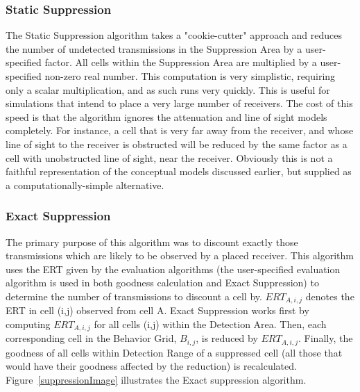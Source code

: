 \subsubsection{Static Suppression}
\label{staticSuppression}
The Static Suppression algorithm takes a "cookie-cutter" approach and reduces the number of undetected transmissions in the Suppression Area by a user-specified factor.  All cells within the Suppression Area are multiplied by a user-specified non-zero real number.  This computation is very simplistic, requiring only a scalar multiplication, and as such runs very quickly.  This is useful for simulations that intend to place a very large number of receivers.  The cost of this speed is that the algorithm ignores the attenuation and line of sight models completely.  For instance, a cell that is very far away from the receiver, and whose line of sight to the receiver is obstructed will be reduced by the same factor as a cell with unobstructed line of sight, near the receiver.  Obviously this is not a faithful representation of the conceptual models discussed earlier, but supplied as a computationally-simple alternative.

\subsubsection{Exact Suppression}
\label{exactSuppression}
The primary purpose of this algorithm was to discount exactly those transmissions which are likely to be observed by a placed receiver.  This algorithm uses the ERT given by the evaluation algorithms (the user-specified evaluation algorithm is used in both goodness calculation and Exact Suppression) to determine the number of transmissions to discount a cell by.  $ERT_{A,i,j}$ denotes the ERT in cell (i,j) observed from cell A.  Exact Suppression works first by computing $ERT_{A,i,j}$ for all cells (i,j)  within the Detection Area.  Then, each corresponding cell in the Behavior Grid, $B_{i,j}$, is reduced by $ERT_{A,i,j}$.  Finally, the goodness of all cells within Detection Range of a suppressed cell (all those that would have their goodness affected by the reduction) is recalculated.  Figure~\ref{suppressionImage} illustrates the Exact suppression algorithm.  

